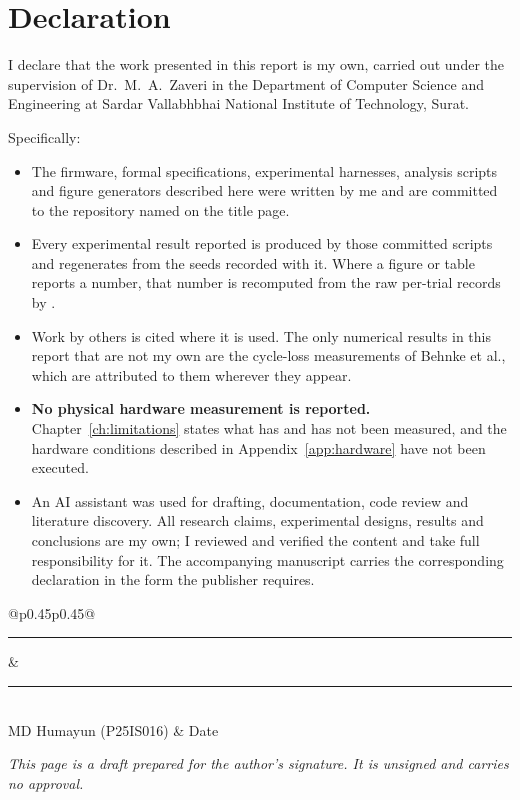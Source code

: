 \chapter*{Declaration}

\noindent I declare that the work presented in this report is my own, carried out under the
supervision of Dr.\ M.\ A.\ Zaveri in the Department of Computer Science and Engineering at
Sardar Vallabhbhai National Institute of Technology, Surat.

\vspace{8pt}
\noindent Specifically:

\begin{itemize}[leftmargin=1.4em,itemsep=3pt]
  \item The firmware, formal specifications, experimental harnesses, analysis scripts and
        figure generators described here were written by me and are committed to the
        repository named on the title page.
  \item Every experimental result reported is produced by those committed scripts and
        regenerates from the seeds recorded with it. Where a figure or table reports a number,
        that number is recomputed from the raw per-trial records by
        .
  \item Work by others is cited where it is used. The only numerical results in this report
        that are not my own are the cycle-loss measurements of Behnke et al., which are
        attributed to them wherever they appear.
  \item \textbf{No physical hardware measurement is reported.} Chapter~\ref{ch:limitations}
        states what has and has not been measured, and the hardware conditions described in
        Appendix~\ref{app:hardware} have not been executed.
  \item An AI assistant was used for drafting, documentation, code review and literature
        discovery. All research claims, experimental designs, results and conclusions are my
        own; I reviewed and verified the content and take full responsibility for it. The
        accompanying manuscript carries the corresponding declaration in the form the
        publisher requires.
\end{itemize}

\vspace{36pt}
\noindent\begin{tabular}{@{}p{0.45\textwidth}p{0.45\textwidth}@{}}
\rule{0.9\linewidth}{0.4pt} & \rule{0.9\linewidth}{0.4pt} \\
MD Humayun \quad (P25IS016) & Date \\
\end{tabular}

\vspace{20pt}
\noindent\textit{\small This page is a draft prepared for the author's signature. It is
unsigned and carries no approval.}
